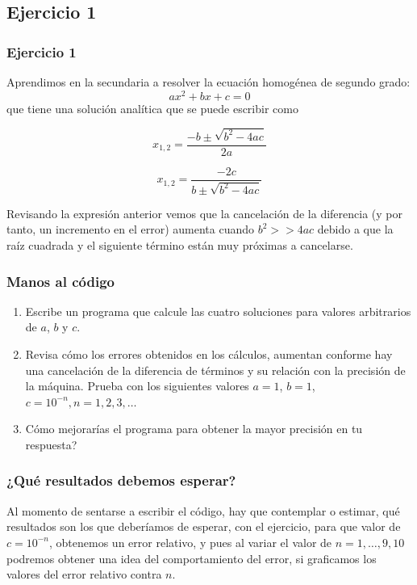 \subsection{Ejercicio 1}
\begin{frame}
\frametitle{Ejercicio 1}
Aprendimos en la secundaria a resolver la ecuación homogénea de segundo grado:
\[ ax^{2} + bx + c = 0\]
que tiene una solución analítica que se puede escribir como
\\
\medskip
\begin{minipage}{5cm}
\[ x_{1,2} = \dfrac{-b \pm \sqrt{b^{2} - 4ac}}{2a}\]
\end{minipage}
\hspace{0.5cm}
\begin{minipage}{5cm}
\[ x_{1,2} = \dfrac{-2c}{b \pm \sqrt{b^{2}-4ac}}\]
\end{minipage}
\end{frame}
\begin{frame}
Revisando la expresión anterior vemos que la cancelación de la diferencia (y por tanto, un incremento en el error) aumenta cuando $b^{2} >> 4ac$ debido a que la raíz cuadrada y el siguiente término están muy próximas a cancelarse.
\end{frame}
\begin{frame}
\frametitle{Manos al código}
\begin{enumerate}[<+->]
\item Escribe un programa que calcule las cuatro soluciones para valores arbitrarios de $a$, $b$ y $c$.
\item Revisa cómo los errores obtenidos en los cálculos, aumentan conforme hay una cancelación de la diferencia de términos y su relación con la precisión de la máquina. Prueba con los siguientes valores $a=1$, $b=1$, $c=10^{-n}, n=1,2,3,\ldots$
\item Cómo mejorarías el programa para obtener la mayor precisión en tu respuesta?
\end{enumerate}
\end{frame}
\begin{frame}[fragile]
\frametitle{¿Qué resultados debemos esperar?}
Al momento de sentarse a escribir el código, hay que contemplar o estimar, qué resultados son los que deberíamos de esperar, con el ejercicio, para que valor de $c=10^{-n}$, obtenemos un error relativo, y pues al variar el valor de $n=1, \ldots,9,10$ podremos obtener una idea del comportamiento del error, si graficamos los valores del error relativo contra $n$.
\end{frame}
